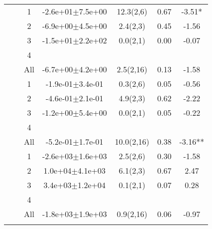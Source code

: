 \begin{longtable}{llccccS[table-format=-2.2, table-space-text-post = {***}]}
{} & {} & 1 & -2.6e+01$\pm$7.5e+00 & 12.3(2,6) & 0.67 & -3.51* \\ 
   &  & 2 & -6.9e+00$\pm$4.5e+00 & 2.4(2,3) & 0.45 & -1.56 \\ 
   &  & 3 & -1.5e+01$\pm$2.2e+02 & 0.0(2,1) & 0.00 & -0.07 \\ 
   &  & 4 &  &  &  &  \\ 
   &  & All & -6.7e+00$\pm$4.2e+00 & 2.5(2,16) & 0.13 & -1.58 \\ 
   \midrule
{} & {} & 1 & -1.9e-01$\pm$3.4e-01 & 0.3(2,6) & 0.05 & -0.56 \\ 
   &  & 2 & -4.6e-01$\pm$2.1e-01 & 4.9(2,3) & 0.62 & -2.22 \\ 
   &  & 3 & -1.2e+00$\pm$5.4e+00 & 0.0(2,1) & 0.05 & -0.22 \\ 
   &  & 4 &  &  &  &  \\ 
   &  & All & -5.2e-01$\pm$1.7e-01 & 10.0(2,16) & 0.38 & -3.16** \\ 
   \midrule
{} & {} & 1 & -2.6e+03$\pm$1.6e+03 & 2.5(2,6) & 0.30 & -1.58 \\ 
   &  & 2 &  1.0e+04$\pm$4.1e+03 & 6.1(2,3) & 0.67 & 2.47 \\ 
   &  & 3 &  3.4e+03$\pm$1.2e+04 & 0.1(2,1) & 0.07 & 0.28 \\ 
   &  & 4 &  &  &  &  \\ 
   &  & All & -1.8e+03$\pm$1.9e+03 & 0.9(2,16) & 0.06 & -0.97 \\ 
   \bottomrule
\label{bivar_lm_summ}
\end{longtable}

